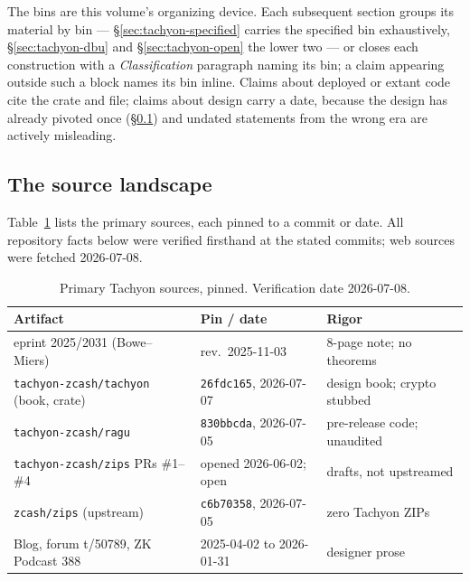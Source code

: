 \documentclass[11pt,a4paper]{article}
\theoremstyle{definition}
\begin{document}
The bins are this volume's organizing device. Each subsequent section groups
its material by bin --- \S\ref{sec:tachyon-specified} carries the specified
bin exhaustively, \S\ref{sec:tachyon-dbu} and \S\ref{sec:tachyon-open} the
lower two --- or closes each construction with a \emph{Classification}
paragraph naming its bin; a claim appearing outside such a block names its
bin inline. Claims about deployed or extant code cite
the crate and file; claims about design carry a date, because the design has
already pivoted once (\S\ref{sec:tachyon-sources}) and undated statements from
the wrong era are actively misleading.

\subsection{The source landscape}\label{sec:tachyon-sources}

Table~\ref{tab:tachyon-sources} lists the primary sources, each pinned to a
commit or date. All repository facts below were verified firsthand at the
stated commits; web sources were fetched 2026-07-08.

\begin{table}[htbp]
\centering
\small
\begin{tabular}{@{}lll@{}}
\toprule
Artifact & Pin / date & Rigor \\
\midrule
eprint 2025/2031 (Bowe--Miers)
  & rev.\ 2025-11-03            & 8-page note; no theorems \\
\texttt{tachyon-zcash/tachyon} (book, crate)
  & \texttt{26fdc165}, 2026-07-07 & design book; crypto stubbed \\
\texttt{tachyon-zcash/ragu}
  & \texttt{830bbcda}, 2026-07-05 & pre-release code; unaudited \\
\texttt{tachyon-zcash/zips} PRs \#1--\#4
  & opened 2026-06-02; open     & drafts, not upstreamed \\
\texttt{zcash/zips} (upstream)
  & \texttt{c6b70358}, 2026-07-05 & zero Tachyon ZIPs \\
Blog, forum t/50789, ZK Podcast 388
  & 2025-04-02 to 2026-01-31    & designer prose \\
\bottomrule
\end{tabular}
\caption{Primary Tachyon sources, pinned. Verification date 2026-07-08.}
\label{tab:tachyon-sources}
\end{table}
\end{document}

